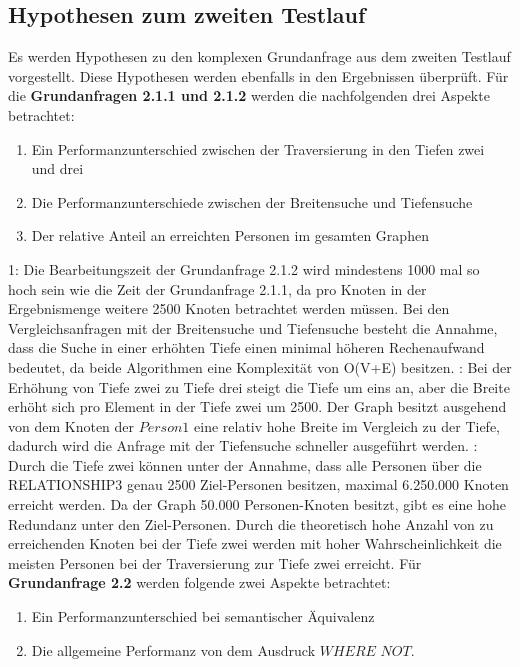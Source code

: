 \subsection{Hypothesen zum zweiten Testlauf}
Es werden Hypothesen zu den komplexen Grundanfrage aus dem zweiten Testlauf vorgestellt. Diese Hypothesen werden ebenfalls in den Ergebnissen überprüft.\newline \newline
Für die \textbf{Grundanfragen 2.1.1 und 2.1.2} werden die nachfolgenden drei Aspekte betrachtet: 
\begin{enumerate}
	\item Ein Performanzunterschied zwischen der Traversierung in den Tiefen zwei und drei 
	\item Die Performanzunterschiede zwischen der Breitensuche und Tiefensuche
	\item Der relative Anteil an erreichten Personen im gesamten Graphen
\end{enumerate}
 1: Die Bearbeitungszeit der Grundanfrage 2.1.2 wird mindestens 1000 mal so hoch sein wie die Zeit der Grundanfrage 2.1.1, da pro Knoten in der Ergebnismenge weitere 2500 Knoten betrachtet werden müssen. Bei den Vergleichsanfragen mit der  Breitensuche und Tiefensuche besteht die Annahme, dass die Suche in einer erhöhten Tiefe einen minimal höheren Rechenaufwand bedeutet, da beide Algorithmen eine Komplexität von O(V+E) besitzen. : Bei der Erhöhung von Tiefe zwei zu Tiefe drei steigt die Tiefe um eins an, aber die Breite erhöht sich pro Element in der Tiefe zwei um 2500. Der Graph besitzt ausgehend von dem Knoten der $Person1$ eine relativ hohe Breite im Vergleich zu der Tiefe, dadurch wird die Anfrage mit der Tiefensuche  schneller ausgeführt werden. : Durch die Tiefe zwei können unter der Annahme, dass alle Personen über die RELATIONSHIP3 genau 2500 Ziel-Personen besitzen, maximal 6.250.000 Knoten erreicht werden. Da der Graph 50.000 Personen-Knoten besitzt, gibt es eine hohe Redundanz unter den Ziel-Personen. Durch die theoretisch hohe Anzahl von zu erreichenden Knoten bei der Tiefe zwei werden mit hoher Wahrscheinlichkeit die meisten Personen bei der Traversierung zur Tiefe zwei erreicht. \newline \newline
Für \textbf{Grundanfrage 2.2} werden folgende zwei Aspekte betrachtet: 
\begin{enumerate}
	\item Ein Performanzunterschied bei  semantischer Äquivalenz  
	\item Die allgemeine Performanz von dem Ausdruck $WHERE$ $NOT$.
\end{enumerate}
